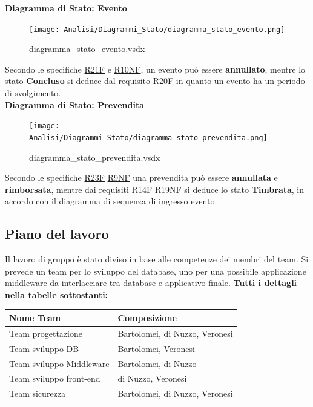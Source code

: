 \documentclass[a4paper]{article}
\begin{document}
\textbf{Diagramma di Stato: Evento}

\begin{figure}[H]
    \texttt{[image: Analisi/Diagrammi\_Stato/diagramma\_stato\_evento.png]}
    \centering
    \caption{diagramma\_stato\_evento.vsdx}
\end{figure}

Secondo le specifiche \hyperlink{R21F}{R21F} e \hyperlink{R10NF}{R10NF}, un evento può essere \textbf{annullato}, mentre lo stato \textbf{Concluso} si deduce dal requisito \hyperlink{R20F}{R20F} in quanto un evento ha un periodo di svolgimento.\\

\textbf{Diagramma di Stato: Prevendita}

\begin{figure}[H]
    \texttt{[image: Analisi/Diagrammi\_Stato/diagramma\_stato\_prevendita.png]}
    \centering
    \caption{diagramma\_stato\_prevendita.vsdx}
\end{figure}

Secondo le specifiche \hyperlink{R23F}{R23F} \hyperlink{R9NF}{R9NF} una prevendita può essere \textbf{annullata} e \textbf{rimborsata}, mentre dai requisiti \hyperlink{R14F}{R14F} \hyperlink{R19NF}{R19NF} si deduce lo stato \textbf{Timbrata}, in accordo con il diagramma di sequenza di ingresso evento.

\newpage

\subsection{Piano del lavoro}

Il lavoro di gruppo è stato diviso in base alle competenze dei membri del team. Si prevede un team per lo sviluppo del database, uno per una possibile applicazione middleware da interlacciare tra database e applicativo finale. \textbf{Tutti i dettagli nella tabelle sottostanti:}

\begin{center}
    \begin{tabularx}{1\textwidth}{|X|X|}
        \hline
        \textbf{Nome Team} & \textbf{Composizione}\\
        \hline
        \hline
        Team progettazione & Bartolomei, di Nuzzo, Veronesi\\
        \hline
        Team sviluppo DB & Bartolomei, Veronesi\\
        \hline
        Team sviluppo Middleware & Bartolomei, di Nuzzo\\
        \hline
        Team sviluppo front-end & di Nuzzo, Veronesi\\
        \hline
        Team sicurezza & Bartolomei, di Nuzzo, Veronesi\\
        \hline
    \end{tabularx}
\end{center}
\end{document}
